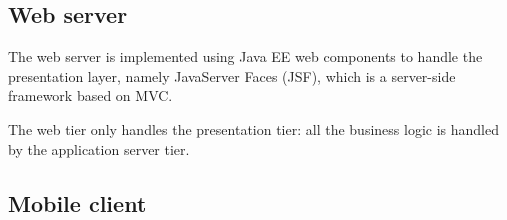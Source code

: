 \subsection{Web server}
The web server is implemented using Java EE web components to handle the presentation layer, namely JavaServer Faces (JSF), which is a server-side framework based on MVC.

The web tier only handles the presentation tier: all the business logic is handled by the application server tier.

\subsection{Mobile client}
